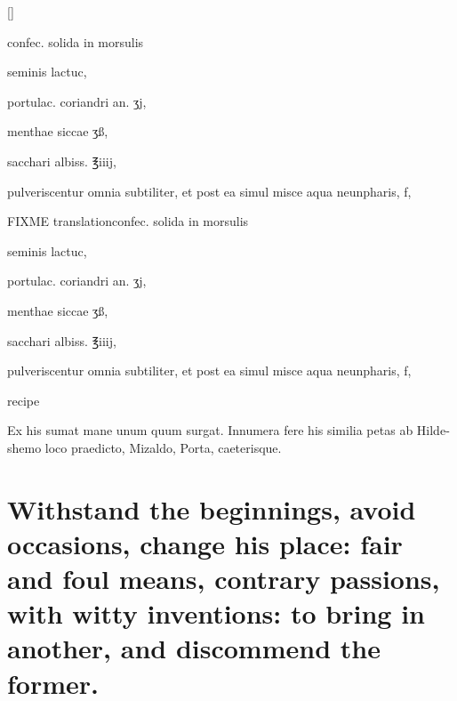 
\begin{Prescription}[H]
[\baselineskip]
\begin{prescriptionbox}{}{\textlatin{confec. solida in morsulis}}
\item \textlatin{seminis lactuc},
\item \textlatin{portulac. coriandri an. ʒj},
\item \textlatin{menthae siccae ʒß},
\item \textlatin{sacchari albiss. ℥iiij},
\item \textlatin{pulveriscentur omnia subtiliter, et post ea simul misce aqua neunpharis, f},
\end{prescriptionbox}
\begin{prescriptionbox}{FIXME translation}{\textlatin{confec. solida in morsulis}}
\item \textlatin{seminis lactuc},
\item \textlatin{portulac. coriandri an. ʒj},
\item \textlatin{menthae siccae ʒß},
\item \textlatin{sacchari albiss. ℥iiij},
\item \textlatin{pulveriscentur omnia subtiliter, et post ea simul misce aqua neunpharis, f},
\end{prescriptionbox}
\caption{ recipe}
\end{Prescription}

\begin{latin}
Ex his sumat mane unum quum
surgat. Innumera fere his similia petas ab Hildeshemo loco praedicto,
Mizaldo, Porta, caeterisque.
\end{latin}

\section[Withstand the beginnings, avoid occasions of love]{Withstand the beginnings, avoid occasions, change his place: fair and foul means, contrary passions, with witty inventions: to bring in another, and discommend the former.}

